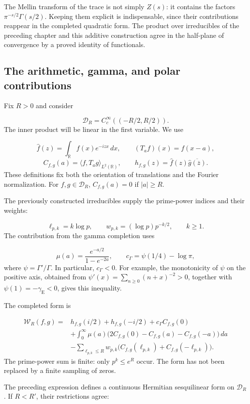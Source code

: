 The Mellin transform of the trace is not simply \(Z(s)\): it contains the factors \(\pi^{-s/2}\Gamma(s/2)\). Keeping them explicit is indispensable, since their contributions reappear in the completed quadratic form. The product over irreducibles of the preceding chapter and this additive construction agree in the half-plane of convergence by a proved identity of functionals.

\subsection{The arithmetic, gamma, and polar contributions}
\label{viii:rz:forma}
Fix \(R>0\) and consider

\[
\mathcal D_R=C_c^\infty((-R/2,R/2)).
\]
The inner product will be linear in the first variable. We use

\[
\widehat f(z)=\int_{\mathbb R}f(x)e^{-izx}\,dx,\qquad
(T_af)(x)=f(x-a),
\]
\[
C_{f,g}(a)=\langle f,T_ag\rangle_{L^2(\mathbb R)},\qquad
h_{f,g}(z)=\widehat f(z)\overline{\widehat g(\overline z)}.
\]
These definitions fix both the orientation of translations and the Fourier normalization. For \(f,g\in\mathcal D_R\), \(C_{f,g}(a)=0\) if \(|a|\geq R\).

The previously constructed irreducibles supply the prime-power indices and their weights:

\[
\ell_{p,k}=k\log p,\qquad
w_{p,k}=(\log p)p^{-k/2},\qquad k\geq1.
\]
The contribution from the gamma completion uses

\[
\mu(a)=\frac{e^{-a/2}}{1-e^{-2a}},\qquad
c_\Gamma=\psi(1/4)-\log\pi,
\]
where \(\psi=\Gamma'/\Gamma\). In particular, \(c_\Gamma<0\). For example, the monotonicity of \(\psi\) on the positive axis, obtained from \(\psi'(x)=\sum_{n\geq0}(n+x)^{-2}>0\), together with \(\psi(1)=-\gamma_{\mathrm E}<0\), gives this inequality.

The completed form is

\[
\begin{aligned}
\mathscr W_R(f,g)={}&h_{f,g}(i/2)+h_{f,g}(-i/2)
+c_\Gamma C_{f,g}(0)\\
&+\int_0^\infty\mu(a)
\bigl(2C_{f,g}(0)-C_{f,g}(a)-C_{f,g}(-a)\bigr)\,da\\
&-\sum_{\ell_{p,k}\leq R}w_{p,k}
\bigl(C_{f,g}(\ell_{p,k})+C_{f,g}(-\ell_{p,k})\bigr).
\end{aligned}
\]
The prime-power sum is finite: only \(p^k\leq e^R\) occur. The form has not been replaced by a finite sampling of zeros.

The preceding expression defines a continuous Hermitian sesquilinear form on \(\mathcal D_R\). If \(R<R'\), their restrictions agree:

